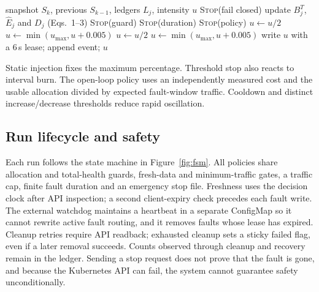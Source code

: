 \documentclass[a4paper,fleqn,11pt]{cas-dc}
\begin{document}
\begin{algorithm}[t]
\caption{One control tick}\label{alg:tick}
\footnotesize
\begin{algorithmic}[1]
\Require snapshot $S_k$, previous $S_{k-1}$, ledgers $L_j$, intensity $u$
  \State \Return \textsc{Stop}(fail closed)
\EndIf
{}
  \State update $B^T_j$, $\widehat E_j$ and $D_j$ (Eqs.~1--3)
    \State \Return \textsc{Stop}(guard)
  \EndIf
\EndFor
{}
  \State \Return \textsc{Stop}(duration)
\EndIf
{}
  \State \Return \textsc{Stop}(policy)
\EndIf
{}
      \State $u\gets u/2$
      \State $u\gets\min(u_{\max},u+0.005)$
    \EndIf
      \State $u\gets u/2$
      \State $u\gets\min(u_{\max},u+0.005)$
    \EndIf
  \EndIf
\EndIf
\State write $u$ with a 6\,s lease; append event; \Return $u$
\end{algorithmic}
\end{algorithm}

Static injection fixes the maximum percentage. Threshold stop also reacts to interval burn. The open-loop policy uses an independently measured cost and the usable allocation divided by expected fault-window traffic. Cooldown and distinct increase/decrease thresholds reduce rapid oscillation.

\subsection{Run lifecycle and safety}
Each run follows the state machine in Figure~\ref{fig:fsm}. All policies share allocation and total-health guards, fresh-data and minimum-traffic gates, a traffic cap, finite fault duration and an emergency stop file. Freshness uses the decision clock after API inspection; a second client-expiry check precedes each fault write. The external watchdog maintains a heartbeat in a separate ConfigMap so it cannot rewrite active fault routing, and it removes faults whose lease has expired. Cleanup retries require API readback; exhausted cleanup sets a sticky failed flag, even if a later removal succeeds. Counts observed through cleanup and recovery remain in the ledger. Sending a stop request does not prove that the fault is gone, and because the Kubernetes API can fail, the system cannot guarantee safety unconditionally.
\end{document}
